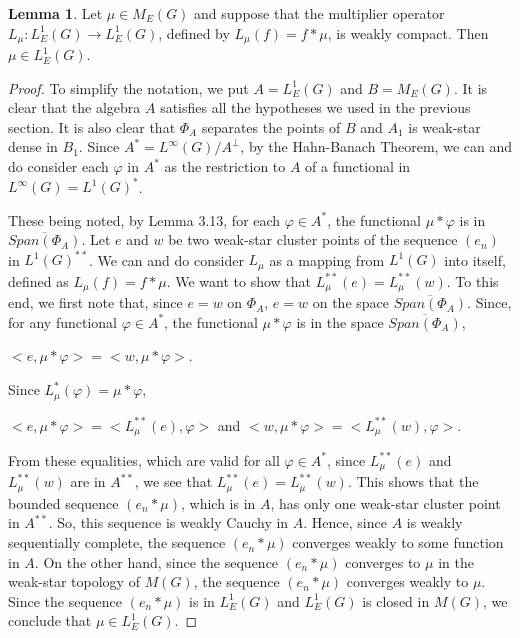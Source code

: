 \documentclass[12pt, twoside, leqno]{article}
\theoremstyle{definition}
\newtheorem{lemma}[theorem]{Lemma}
\theoremstyle{definition}
\numberwithin{equation}{section}
\begin{document}
\begin{lemma}
	Let $ \mu\in M_{E}(G) $ and suppose that the multiplier operator $ L_{\mu}:L_{E}^{1}(G)\rightarrow L^{1}_{E}(G) $, defined by $ L_{\mu}(f)=f*\mu $, is weakly compact. Then $ \mu\in L_{E}^{1}(G) $.
\end{lemma}
\begin{proof} To simplify the notation, we put $ A=L^{1}_{E}(G) $ and $ B=M_{E}(G) $. It is clear that the algebra $ A $ satisfies all the hypotheses we used in the previous section. It is also clear that $ \Phi_{A} $ separates the points of $ B $ and $ A_{1} $ is weak-star dense in $ B_{1} $. Since $ A^{*}=L^{\infty}(G)/A^{\perp} $, by the Hahn-Banach Theorem, we can and do consider each $ \varphi $ in $ A^{*} $ as the restriction to $ A $ of a functional in $ L^{\infty}(G)=L^{1}(G)^{*} $.\vspace{1mm}
	
	 These being noted, by Lemma 3.13, for each $ \varphi\in A^{*} $, the functional $ \mu* \varphi $ is in $ \overline{Span(\Phi_{A})} $.  Let $e $ and $ w $ be two weak-star cluster points of the sequence $ (e_{n}) $ in $ L^{1}(G)^{**} $. We can and do consider $L_{\mu}$ as a mapping from $L^{1}(G)$ into itself, defined as $L_{\mu}(f)=f*\mu$. We want to show that $ L_{\mu}^{**}(e)=L_{\mu}^{**}(w) $. To this end, we first note that, since $ e=w $ on $ \Phi_{A} $, $ e=w $ on the space $ \overline{Span(\Phi_{A})} $.
	 Since, for any functional $ \varphi\in A^{*} $, the functional $ \mu*\varphi $ is in the space $ \overline{Span(\Phi_{A})} $,\vspace{3mm}
	 
	 $ <e,\mu*\varphi>=<w,\mu*\varphi> $.\vspace{3mm}
	 
	 \noindent Since $ L_{\mu}^{*}(\varphi)=\mu*\varphi $,\vspace{3mm}

	  $ <e,\mu*\varphi>=<L_{\mu}^{**}(e),\varphi>$ and $<w,\mu*\varphi>=<L_{\mu}^{**}(w),\varphi> $. \vspace{3mm}
	  
	\noindent From these equalities, which are valid for all $\varphi\in A^{*}$, since $L_{\mu}^{**}(e)$ and $L_{\mu}^{**}(w)$ are in $A^{**}$, we see that $ L_{\mu}^{**}(e)=L_{\mu}^{**}(w) $. This shows that the bounded sequence $ (e_{n}*\mu) $, which is in $ A $, has only one weak-star cluster point in $ A^{**} $. So, this sequence is weakly Cauchy in $ A $. Hence, since $ A $ is weakly sequentially complete, the sequence $ (e_{n}*\mu) $ converges weakly to some function in $ A $. On the other hand, since the sequence $ (e_{n}*\mu) $ converges to $ \mu $ in the weak-star topology of $ M(G) $,  the sequence $ (e_{n}*\mu) $ converges weakly to $ \mu $. Since the sequence $ (e_{n}*\mu) $ is in $ L^{1}_{E}(G) $ and $ L_{E}^{1}(G) $ is closed in $ M(G) $, we conclude that $ \mu\in L^{1}_{E}(G) $.    
\end{proof}
\end{document}
